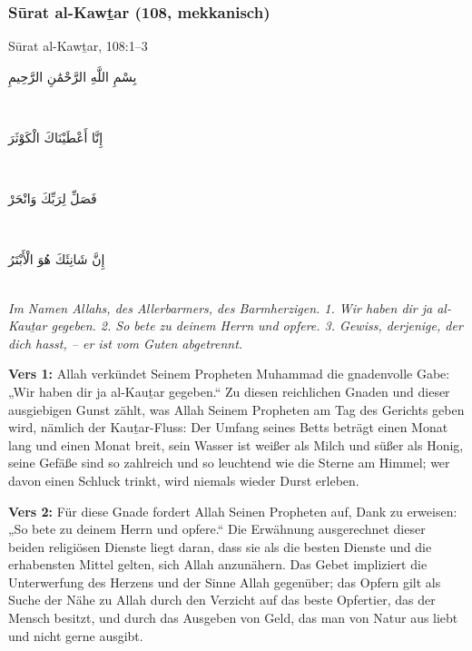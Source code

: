 \subsubsection*{Sūrat al-Kawṯar (108, mekkanisch)}

\begin{quranvers}{Sūrat al-Kawṯar, 108:1--3}
{\quranfont\begin{Arabic}
بِسْمِ اللَّهِ الرَّحْمَٰنِ الرَّحِيمِ
\end{Arabic}}\\[2mm]
{\quranfont\begin{Arabic}
إِنَّا أَعْطَيْنَاكَ الْكَوْثَرَ
\end{Arabic}}\\[2mm]
{\quranfont\begin{Arabic}
فَصَلِّ لِرَبِّكَ وَانْحَرْ
\end{Arabic}}\\[2mm]
{\quranfont\begin{Arabic}
إِنَّ شَانِئَكَ هُوَ الْأَبْتَرُ
\end{Arabic}}\\[3mm]
\emph{Im Namen Allahs, des Allerbarmers, des Barmherzigen. 1. Wir haben dir ja al-Kauṯar
gegeben. 2. So bete zu deinem Herrn und opfere. 3. Gewiss, derjenige, der dich hasst, – er ist
vom Guten abgetrennt.}
\end{quranvers}

\textbf{Vers 1:} Allah  verkündet Seinem Propheten Muhammad  die gnadenvolle Gabe:
„Wir haben dir ja al-Kauṯar gegeben.“ Zu diesen reichlichen Gnaden und dieser ausgiebigen
Gunst zählt, was Allah Seinem Propheten  am Tag des Gerichts geben wird, nämlich der
Kauṯar-Fluss: Der Umfang seines Betts beträgt einen Monat lang und einen Monat breit, sein
Wasser ist weißer als Milch und süßer als Honig, seine Gefäße sind so zahlreich und so
leuchtend wie die Sterne am Himmel; wer davon einen Schluck trinkt, wird niemals wieder Durst
erleben.

\textbf{Vers 2:} Für diese Gnade fordert Allah Seinen Propheten auf, Dank zu erweisen: „So bete zu
deinem Herrn und opfere.“ Die Erwähnung ausgerechnet dieser beiden religiösen Dienste liegt
daran, dass sie als die besten Dienste und die erhabensten Mittel gelten, sich Allah anzunähern.
Das Gebet impliziert die Unterwerfung des Herzens und der Sinne Allah gegenüber; das Opfern
gilt als Suche der Nähe zu Allah durch den Verzicht auf das beste Opfertier, das der Mensch
besitzt, und durch das Ausgeben von Geld, das man von Natur aus liebt und nicht gerne ausgibt.

